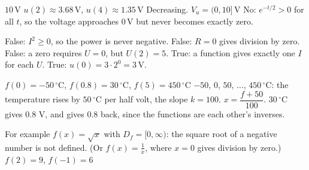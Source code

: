 \begin{facit}
  $10\,\text{V}$  $u(2) \approx 3.68\,\text{V}$,
$u(4) \approx 1.35\,\text{V}$  Decreasing.  $V_u = (0, 10]\,\text{V}$
 No: $e^{-t/2} > 0$ for all $t$, so the voltage approaches $0\,\text{V}$ but never becomes
exactly zero.

  False: $I^2 \geq 0$, so the power is never negative.
 False: $R = 0$ gives division by zero.
 False: a zero requires $U = 0$, but $U(2) = 5$.
 True: a function gives exactly one $I$ for each $U$.
 True: $u(0) = 3 \cdot 2^0 = 3\,\text{V}$.

  $f(0) = -50\,^{\circ}$C, $f(0.8) = 30\,^{\circ}$C, $f(5) = 450\,^{\circ}$C
 $-50$, $0$, $50$, $\ldots$, $450\,^{\circ}$C: the temperature rises by $50\,^{\circ}$C per
half volt, the slope $k = 100$.
 $x = \dfrac{f + 50}{100}$. $30\,^{\circ}$C gives $0.8$ V, and
 gives $0.8$ back, since the functions are each other's
inverses.

  For example $f(x) = \sqrt{x}$ with $D_f = [0, \infty)$: the square
root of a negative number is not defined. (Or $f(x) = \frac{1}{x}$, where $x = 0$ gives division by
zero.)
 $f(2) = 9$, $f(-1) = 6$

\end{facit}
